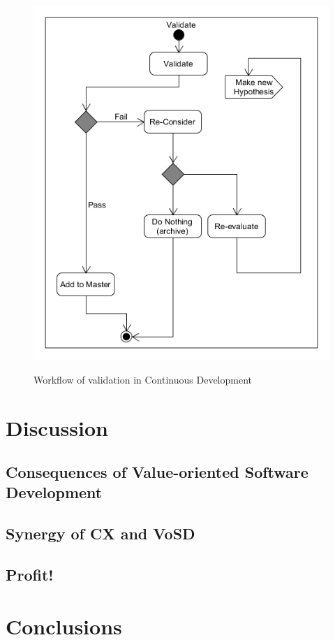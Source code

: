 \documentclass{sig-alternate}
\begin{document}
\begin{figure}
\centering
\caption{Workflow of validation in Continuous Development}
\includegraphics[scale=0.4]{Umlet/ValidateActivity}
\label{fig:validation}
\end{figure}

\section{Discussion}

\subsection{Consequences of Value-oriented Software Development}
\subsection{Synergy of CX and VoSD}
\subsection{Profit!}

\section{Conclusions}
\end{document}

